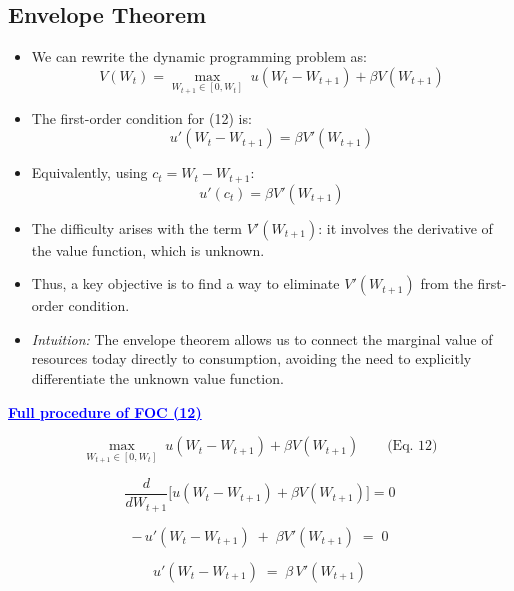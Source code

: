 \documentclass[12pt]{article}
\begin{document}
\subsection*{\noindent\textbf{Envelope Theorem}}

\begin{itemize}
    \item We can rewrite the dynamic programming problem as:
    \[
    V(W_t) = \max_{W_{t+1} \in [0, W_t]} \; u(W_t - W_{t+1}) + \beta V(W_{t+1}) \tag{12}
    \]

    \item The first-order condition for (12) is:
    \[
    u'(W_t - W_{t+1}) = \beta V'(W_{t+1})
    \]

    \item Equivalently, using \( c_t = W_t - W_{t+1} \):
    \[
    u'(c_t) = \beta V'(W_{t+1})
    \]

    \item The difficulty arises with the term \( V'(W_{t+1}) \): it involves the derivative of the value function, which is unknown.

    \item Thus, a key objective is to find a way to eliminate \( V'(W_{t+1}) \) from the first-order condition.

    \item \textit{Intuition:} The envelope theorem allows us to connect the marginal value of resources today directly to consumption, avoiding the need to explicitly differentiate the unknown value function.
\end{itemize}

\textcolor{blue}{\textbf{\uline{Full procedure of FOC (12)}}}

{\color{blue}
\[
\max_{W_{t+1}\in[0,W_t]} \; u(W_t - W_{t+1}) + \beta V(W_{t+1}) \qquad \text{(Eq. 12)}
\]

\[
\frac{d}{dW_{t+1}}\Big[ u(W_t - W_{t+1}) + \beta V(W_{t+1}) \Big] = 0
\]

\[
-\,u'(W_t - W_{t+1}) \;+\; \beta V'(W_{t+1}) \;=\; 0
\]

\[
\boxed{\,u'(W_t - W_{t+1}) \;=\; \beta\, V'(W_{t+1})\,}
\]
}
\end{document}
